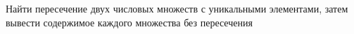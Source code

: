 Найти пересечение двух числовых множеств с уникальными элементами, затем вывести содержимое каждого множества без пересечения